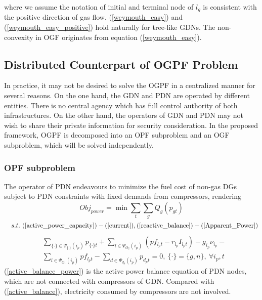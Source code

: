 \documentclass[journal]{IEEEtran}
\begin{document}
\noindent where we assume the notation of initial and terminal node of $l_g$ is consistent with the positive direction of gas flow. (\ref{weymouth_easy}) and (\ref{weymouth_easy_positive}) hold naturally for tree-like GDNs. The non-convexity in OGF originates from equation (\ref{weymouth_easy}).

\subsection{Distributed Counterpart of OGPF Problem}
In practice, it may not be desired to solve the OGPF in a centralized manner for several reasons. On the one hand, the GDN and PDN are operated by different entities. There is no central agency which has full control authority of both infrastructures. On the other hand, the operators of GDN and PDN may not wish to share their private information for security consideration. In the proposed framework, OGPF is decomposed into an OPF subproblem and an OGF subproblem, which will be solved independently.

\subsubsection{OPF subproblem}
The operator of PDN endeavours to minimize the fuel cost of non-gas DGs subject to PDN constraints with fixed demands from compressors, rendering
\begin{equation}\label{Obj_OPF}
Obj_{power}=\min \sum_{t}\sum_{g}Q_g(p_{gt})
\end{equation}
\begin{equation*}
~~~s.t.~(\ref{active_power_capacity})-(\ref{current}), (\ref{reactive_balance})-(\ref{Apparent_Power})
\end{equation*}
\begin{equation}
\begin{split}
\label{active_balance_power}
& \sum_{\{\cdot\}\in \Psi_{\{\cdot\}}(i_p)}p_{\{\cdot\}t}+\sum_{l\in \Psi_{O_2}(i_p)}(pf_{l_pt}-r_{l_p}I_{l_pt})-g_{i_p}\nu_{i_p}-\\
&\sum_{l\in\Psi_{O_1}(i_p)}pf_{l_pt}-\sum_{d\in \Psi_{d_p}(i_p)}p_{d_pt}=0,~\{\cdot\}=\{g,n\},~\forall i_p,t
\end{split}
\end{equation}
(\ref{active_balance_power}) is the active power balance equation of PDN nodes, which are not connected with compressors of GDN. Compared with (\ref{active_balance}), electricity consumed by compressors are not involved.
\end{document}
